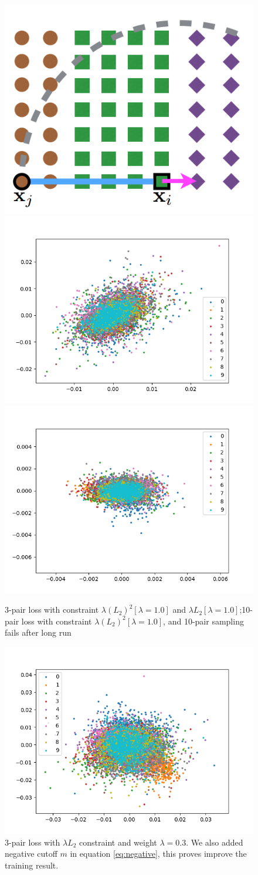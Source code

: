 \documentclass[10pt,twocolumn,letterpaper]{article}
\begin{document}
\begin{figure}[t]
				\begin{center}
					\includegraphics[width=0.4\linewidth]{constrastiveDemo}\includegraphics[width=0.5\linewidth]{fig600}
					\includegraphics[width=0.5\linewidth]{fig2500}
					\caption{3-pair loss with constraint $\lambda (L_2)^2[\lambda=1.0]$ and $\lambda L_2[\lambda=1.0]$;10-pair loss with constraint $\lambda (L_2)^2[\lambda=1.0]$, and 10-pair sampling fails after long run}
					\includegraphics[width=0.9\linewidth]{fig150}
				\end{center}
				\caption{3-pair loss with $\lambda L_2$ constraint and weight $\lambda=0.3$.  We also added negative cutoff $m$ in equation \ref{eq:negative}, this proves improve the training result.}
				

\end{figure}
\end{document}
